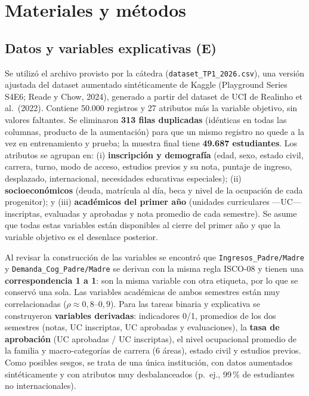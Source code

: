 \documentclass[titlepage,a4paper]{article}
\newcommand{\code}[1]{\texttt{#1}}
\begin{document}
\section{Materiales y métodos}\label{sec:metodos}

\subsection{Datos y variables explicativas (E)}

Se utilizó el archivo provisto por la cátedra (\code{dataset\_TP1\_2026.csv}), una versión ajustada del dataset aumentado sintéticamente de Kaggle (Playground Series S4E6; Reade y Chow, 2024), generado a partir del dataset de UCI de Realinho et al.\ (2022). Contiene 50.000 registros y 27 atributos más la variable objetivo, sin valores faltantes. Se eliminaron \textbf{313 filas duplicadas} (idénticas en todas las columnas, producto de la aumentación) para que un mismo registro no quede a la vez en entrenamiento y prueba; la muestra final tiene \textbf{49.687 estudiantes}. Los atributos se agrupan en: (i) \textbf{inscripción y demografía} (edad, sexo, estado civil, carrera, turno, modo de acceso, estudios previos y su nota, puntaje de ingreso, desplazado, internacional, necesidades educativas especiales); (ii) \textbf{socioeconómicos} (deuda, matrícula al día, beca y nivel de la ocupación de cada progenitor); y (iii) \textbf{académicos del primer año} (unidades curriculares ---UC--- inscriptas, evaluadas y aprobadas y nota promedio de cada semestre). Se asume que todas estas variables están disponibles al cierre del primer año y que la variable objetivo es el desenlace posterior.

Al revisar la construcción de las variables se encontró que \code{Ingresos\_Padre/Madre} y \code{Demanda\_Cog\_Padre/Madre} se derivan con la misma regla ISCO-08 y tienen una \textbf{correspondencia 1 a 1}: son la misma variable con otra etiqueta, por lo que se conservó una sola. Las variables académicas de ambos semestres están muy correlacionadas ($\rho \approx 0{,}8$--$0{,}9$). Para las tareas binaria y explicativa se construyeron \textbf{variables derivadas}: indicadores 0/1, promedios de los dos semestres (notas, UC inscriptas, UC aprobadas y evaluaciones), la \textbf{tasa de aprobación} (UC aprobadas / UC inscriptas), el nivel ocupacional promedio de la familia y macro-categorías de carrera (6 áreas), estado civil y estudios previos. Como posibles sesgos, se trata de una única institución, con datos aumentados sintéticamente y con atributos muy desbalanceados (p.\ ej., 99\,\% de estudiantes no internacionales).
\end{document}
